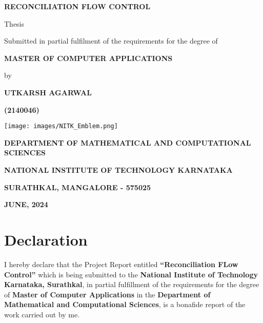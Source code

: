 \documentclass[12pt,a4paper]{report}
\begin{document}
\begin{titlepage}
    \centering
    {\Huge \bfseries{RECONCILIATION FLOW CONTROL}\par}
    \vspace{0.5cm}
    {\large Thesis\\ \par}
    {\large Submitted in partial fulfilment of the requirements for the degree of\par}
  \vspace{0.5cm}
    {\Large\bfseries MASTER OF COMPUTER APPLICATIONS\par}  %
  \vspace{0.5cm}
    {\large by\par}
  \vspace{0.5cm}
    {\Large\bfseries UTKARSH AGARWAL\par}
    \vspace{0.5cm}
    {\Large\bfseries (2140046)\par}
  \vspace{0.5cm}
    \texttt{[image: images/NITK\_Emblem.png]}\\
    \vspace{1cm}
    {\large\bfseries DEPARTMENT OF MATHEMATICAL AND COMPUTATIONAL SCIENCES \par} 
    \vspace{0.5cm}
    {\large\bfseries NATIONAL INSTITUTE OF TECHNOLOGY KARNATAKA \par} 
    {\large\bfseries SURATHKAL, MANGALORE - 575025\par}
    \vspace{0.5cm}
    {\large\bfseries JUNE, 2024\par}
\end{titlepage}

\chapter*{Declaration}
I hereby declare that the Project Report entitled \textbf{“Reconciliation FLow Control”} which is being submitted to the \textbf{National Institute of Technology Karnataka, Surathkal}, in partial fulfillment of the requirements for the degree of \textbf{Master of Computer Applications} in the \textbf{Department of Mathematical and Computational Sciences}, is a bonafide report of the work carried out by me.
\end{document}
